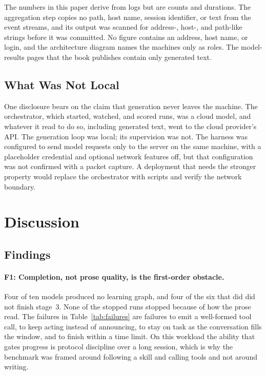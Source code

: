 \documentclass[11pt]{article}
\begin{document}
The numbers in this paper derive from logs but are counts and durations. The aggregation step copies no path, host name, session identifier, or text from the event streams, and its output was scanned for address-, host-, and path-like strings before it was committed. No figure contains an address, host name, or login, and the architecture diagram names the machines only as roles. The model-results pages that the book publishes contain only generated text.

\subsection{What Was Not Local}

One disclosure bears on the claim that generation never leaves the machine. The orchestrator, which started, watched, and scored runs, was a cloud model, and whatever it read to do so, including generated text, went to the cloud provider's API. The generation loop was local; its supervision was not. The harness was configured to send model requests only to the server on the same machine, with a placeholder credential and optional network features off, but that configuration was not confirmed with a packet capture. A deployment that needs the stronger property would replace the orchestrator with scripts and verify the network boundary.

\section{Discussion}
\label{sec:discussion}

\subsection{Findings}

\paragraph{F1: Completion, not prose quality, is the first-order obstacle.}
Four of ten models produced no learning graph, and four of the six that did did not finish stage~3. None of the stopped runs stopped because of how the prose read. The failures in Table~\ref{tab:failures} are failures to emit a well-formed tool call, to keep acting instead of announcing, to stay on task as the conversation fills the window, and to finish within a time limit. On this workload the ability that gates progress is protocol discipline over a long session, which is why the benchmark was framed around following a skill and calling tools and not around writing.
\end{document}
